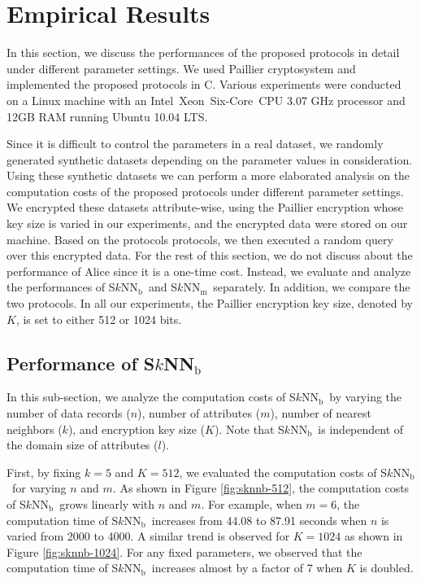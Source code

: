 \documentclass{article}
\newcommand{\sknnb}{S$k$NN$_\textrm{b}$}
\newcommand{\sknnm}{S$k$NN$_\textrm{m}$}
\begin{document}
\section{Empirical Results} \label{sec:exp}
In this section, we discuss the  
performances of the proposed protocols in detail under different parameter settings. 
We used Paillier cryptosystem\cite{paillier-99} 
and implemented the proposed protocols in C. Various experiments 
were conducted on a Linux machine with an 
Intel\textregistered~Xeon\textregistered~Six-Core\texttrademark~CPU 3.07 GHz 
processor and 12GB RAM running Ubuntu 10.04 LTS. 


Since it is difficult to control the parameters in a real dataset, 
we randomly generated synthetic datasets depending on the parameter values in consideration. 
Using these synthetic datasets we can  
perform a more elaborated analysis on the computation costs of the proposed protocols under different 
parameter settings. 
We encrypted these datasets attribute-wise, using the Paillier encryption 
whose key size is varied in our experiments, and the encrypted data were
stored on our machine. Based on the protocols protocols, we then 
executed a random query over this encrypted data. For the rest 
of this section, we do not discuss about the performance of Alice 
since it is a one-time cost. Instead, we evaluate 
and analyze the performances of \sknnb~and \sknnm~separately. In addition, 
we compare the two protocols. In all our experiments, the Paillier 
encryption key size, denoted by $K$, is set to either 512 or 1024 bits.


\subsection{Performance of \sknnb} 
In this sub-section, we analyze the computation costs of \sknnb~by 
varying the number of data records ($n$), number of 
attributes ($m$), number of nearest neighbors ($k$), and encryption key size ($K$). Note 
that \sknnb~is independent of the domain size of attributes ($l$). 

First, by fixing $k =5$ and $K=512$, we evaluated the computation costs 
of \sknnb~for varying $n$ and $m$. As shown in Figure \ref{fig:sknnb-512}, 
the computation costs of \sknnb~grows linearly with $n$ and $m$. For example, 
when $m=6$, the computation time of \sknnb~increases from 44.08 to 87.91 seconds 
when $n$ is varied from 2000 to 4000. A similar trend is observed for $K=1024$  
as shown in Figure \ref{fig:sknnb-1024}. For any fixed parameters, 
we observed that the computation time of \sknnb~increases almost by a factor 
of 7 when $K$ is doubled. 
\end{document}
